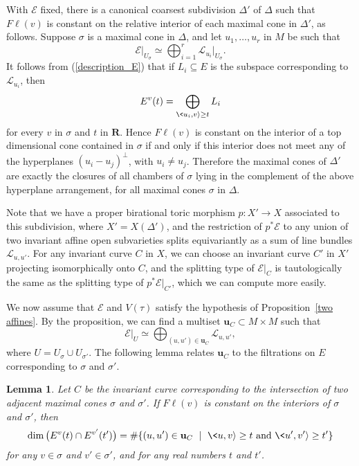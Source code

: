 \documentclass[12pt]{amsart}
\newtheorem{lemma}{Lemma}[section]
\theoremstyle{definition}
\theoremstyle{remark}
\begin{document}
With ${\mathcal{E}}$ fixed, there is a canonical coarsest subdivision
$\Delta'$ of $\Delta$ such that ${F\ell}(v)$ is constant on the relative
interior of each maximal cone in $\Delta'$, as follows.  Suppose
$\sigma$ is a maximal cone in $\Delta$, and let $u_1, \ldots, u_r$
in $M$ be such that
$${\mathcal{E}}\vert_{U_{\sigma}}\simeq\bigoplus_{i=1}^r{\mathcal{L}}_{u_i}\vert_{U_{\sigma}}.$$
It follows from (\ref{description_E}) that if $L_i\subseteq E$ is
the subspace corresponding to ${\mathcal{L}}_{u_i}$, then
 $$E^v(t) = \bigoplus_{\<u_i, v {\rangle} \geq t } L_i$$ for every $v$ in $\sigma$ and $t$ in ${{\mathbf R}}$.
Hence ${F\ell}(v)$ is constant on the interior of a top dimensional cone
contained in $\sigma$ if and only if this interior does not meet any
of the hyperplanes $(u_i-u_j)^{\perp}$, with $u_i\neq u_j$.
Therefore the maximal cones of $\Delta'$ are
 exactly the closures of all chambers of $\sigma$ lying in the complement of the above hyperplane arrangement,
 for all maximal cones $\sigma$ in $\Delta$.

Note that we have a proper birational toric morphism $p: X'
\rightarrow X$
 associated to this subdivision, where $X' = X(\Delta')$, and the restriction of $p^* {\mathcal{E}}$ to any union of two invariant affine open subvarieties splits
  equivariantly as a sum of line bundles ${\mathcal{L}}_{u,u'}$.  For any invariant curve $C$ in $X$, we can choose an invariant
  curve $C'$ in $X'$ projecting isomorphically onto $C$, and the splitting type of ${\mathcal{E}}|_C$ is tautologically the same
  as the splitting type of $p^* {\mathcal{E}} |_{C'}$, which we can compute more easily.

\medskip

We now assume that ${\mathcal{E}}$ and $V(\tau)$ satisfy the hypothesis of
Proposition~\ref{two affines}. By the proposition, we can find a
multiset ${\mathbf{u}}_C \subset M \times M$ such that
\[
{\mathcal{E}}\vert_U \simeq \bigoplus_{(u,u') \in {\mathbf{u}}_C} {\mathcal{L}}_{u,u'},
\]
where $U=U_{\sigma}\cup U_{\sigma'}$. The following lemma relates
${\mathbf{u}}_C$ to the filtrations on $E$ corresponding to $\sigma$ and
$\sigma'$.

\begin{lemma} \label{intersections}
Let $C$ be the invariant curve corresponding to the intersection of two adjacent maximal cones $\sigma$ and $\sigma'$. If ${F\ell}(v)$ is constant on the
interiors of $\sigma$ and $\sigma'$, then
\begin{equation}\label{formula 20}
\dim \big( E^v(t) \cap E^{v'}(t') \big) = \# \{(u,u') \in {\mathbf{u}}_C \ \mid \ \<u,v {\rangle} \geq t \mbox{ and } \<u',v' {\rangle} \geq t' \}
\end{equation}
for any $v \in \sigma$ and $v' \in \sigma'$, and for any real
numbers $t$ and $t'$.
\end{lemma}
\end{document}
